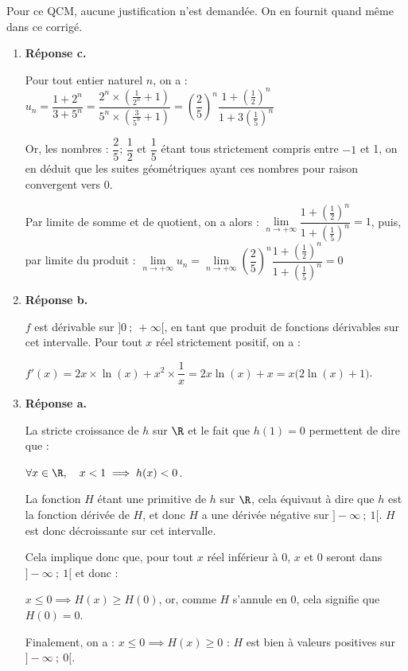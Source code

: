 \bigskip
Pour ce QCM, aucune justification n'est demandée. On en fournit quand même dans ce corrigé.
\begin{enumerate}
	\item \textbf{Réponse c.}

Pour tout entier naturel $n$, on a : $u_n = \dfrac{1 + 2^n}{3 + 5^n } = \dfrac{2^n \times \left(\frac{1}{2^n}+1\right)}{5^n\times \left(\frac{3}{5^n} + 1\right)  } = \left(\dfrac{2}{5}\right)^n \dfrac{1 + \left(\frac{1}{2}\right)^n}{1 + 3\left(\frac{1}{5}\right)^n}$

Or, les nombres : $ \dfrac{2}{5} $; $ \dfrac{1}{2} $ et $ \dfrac{1}{5} $ étant tous strictement compris entre $-1$ et 1, on en déduit que les suites géométriques ayant ces nombres pour raison convergent vers 0.

Par limite de somme et de quotient, on a alors : $ \lim\limits_{n \to +\infty} \dfrac{1 + \left(\frac{1}{2}\right)^n}{1 + \left(\frac{1}{5}\right)^n} = 1$, puis, par limite du produit : $\lim\limits_{n \to +\infty} u_n = \lim\limits_{n \to +\infty}  \left(\dfrac{2}{5}\right)^n \dfrac{1 + \left(\frac{1}{2}\right)^n}{1 + \left(\frac{1}{5}\right)^n}=0$

	\item \textbf{Réponse b.}

$f$ est dérivable sur $ ]0~;~+\infty[ $, en tant que produit de fonctions dérivables sur cet intervalle. Pour tout $x$ réel strictement positif, on a :

$f'(x) = 2x \times \ln(x) + x^2 \times \dfrac{1}{x} = 2x\ln(x) + x = x\big(2\ln(x) + 1\big) $.

	\item \textbf{Réponse a.}

La stricte croissance de $h$ sur $\R$ et le fait que $h(1) = 0$ permettent de dire que :

$\forall x \in \R, \quad x < 1 \implies h(x) < 0$.

La fonction $H$ étant une primitive de $h$ sur $\R$, cela équivaut à dire que $h$ est la fonction dérivée de $H$, et donc $H$ a une dérivée négative sur $ ]-\infty~;~1[ $. $H$ est donc décroissante sur cet intervalle.

Cela implique donc que, pour tout $x$ réel inférieur à 0, $x$ et $0$ seront dans $ ]-\infty~;~1[ $ et donc :

$x \leqslant 0 \implies H(x) \geqslant H(0)$, or, comme $H$ s'annule en 0, cela signifie que $H(0) = 0$.

Finalement, on a : $ x\leqslant 0 \implies H(x) \geqslant 0$ : $H$ est bien à valeurs positives sur $ ]-\infty~;~0[$.


\end{enumerate}
